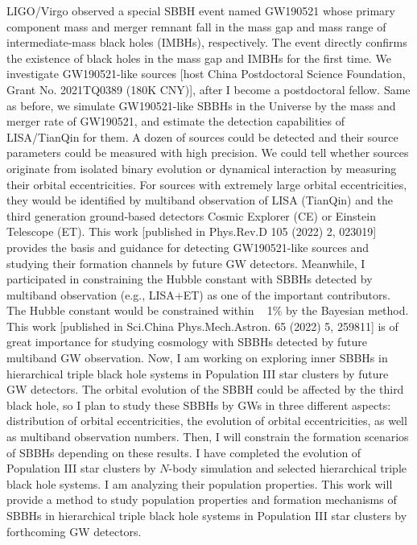 \documentclass[12pt,a4paper,sans]{article}%
\begin{document}
LIGO/Virgo observed a special SBBH event named
GW190521 whose primary component mass and merger remnant fall in the mass gap and mass range of intermediate-mass black holes (IMBHs), respectively. The event directly confirms the existence of
black holes in the mass gap and IMBHs for the first time. We investigate GW190521-like sources [host China Postdoctoral Science Foundation, Grant No. 2021TQ0389 (180K CNY)], after I become a postdoctoral fellow. Same as before, we simulate GW190521-like SBBHs in the
Universe by the mass and merger rate of GW190521, and estimate the detection capabilities of LISA/TianQin for them. A dozen of sources could be detected and their source
parameters could be measured with high precision. We could tell whether sources originate from isolated binary evolution or dynamical interaction by measuring their orbital eccentricities. For sources with extremely large orbital
eccentricities, they would be identified by multiband observation of LISA (TianQin) and the third generation
ground-based detectors Cosmic Explorer (CE) or Einstein
Telescope (ET). This work [published in Phys.Rev.D 105 (2022) 2, 023019] provides
the basis and guidance for detecting GW190521-like sources and studying their formation channels by future GW detectors. Meanwhile, I participated in constraining the Hubble
constant with SBBHs detected by multiband observation (e.g., LISA+ET) as one of the important
contributors. The Hubble constant would be constrained within ~ 1\% by the Bayesian method. This work [published in Sci.China Phys.Mech.Astron. 65 (2022) 5, 259811] is of great
importance for studying cosmology with SBBHs detected by future multiband GW observation. Now, I am working on
exploring inner SBBHs in hierarchical triple black hole systems in Population III star clusters by future GW detectors. The orbital evolution of the SBBH could be affected by the third black hole, so I plan to
study these SBBHs by GWs in three different aspects: distribution of orbital
eccentricities, the evolution of orbital eccentricities, as well as multiband observation numbers. Then, I will constrain the formation scenarios of SBBHs depending on these results. I have completed the evolution of
Population III star clusters by $N$-body simulation and selected hierarchical triple black hole systems. I am analyzing
their population properties. This work will provide a method 
to study population properties and formation mechanisms of SBBHs in hierarchical triple black hole systems in Population III star clusters by forthcoming GW detectors.
\end{document}
